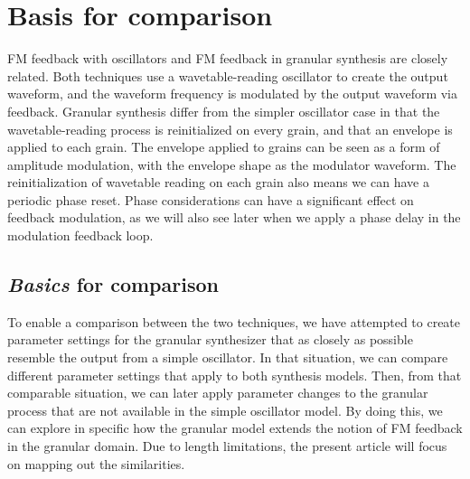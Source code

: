 \documentclass[runningheads,a4paper]{llncs}
\begin{document}
\section{Basis for comparison}
FM feedback with oscillators and FM feedback in granular synthesis are closely related. Both techniques use a wavetable-reading oscillator to create the output waveform, and the waveform frequency is modulated by the output waveform via feedback. Granular synthesis differ from the simpler oscillator case in that the wavetable-reading process is reinitialized on every grain, and that an envelope is applied to each grain. The envelope applied to grains can be seen as a form of amplitude modulation, with the envelope shape as the modulator waveform. The reinitialization of wavetable reading on each grain also means we can have a periodic phase reset. Phase considerations can have a significant effect on feedback modulation, as we will also see later when we apply a phase delay in the modulation feedback loop.

\subsection{\emph{Basics} for comparison}
To enable a comparison between the two techniques, we have attempted to create parameter settings for the granular synthesizer that as closely as possible resemble the output from a simple oscillator. In that situation, we can compare different parameter settings that apply to both synthesis models. Then, from that comparable situation, we can later apply parameter changes to the granular process that are not available in the simple oscillator model. By doing this, we can explore in specific how the granular model extends the notion of FM feedback in the granular domain. Due to length limitations, the present article will focus on mapping out the similarities.
\end{document}
